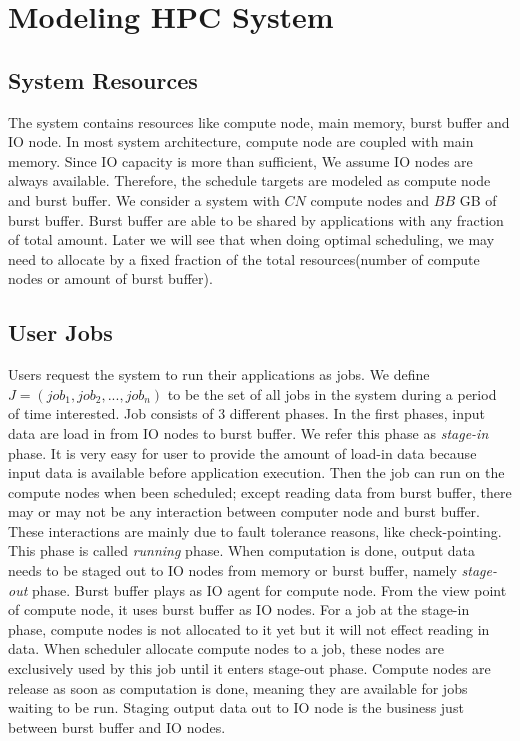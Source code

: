 \section{Modeling HPC System}
\subsection{System Resources}
The system contains resources like compute node, main memory, burst buffer and IO node.
In most system architecture, compute node are coupled with main memory.
Since IO capacity is more than sufficient, We assume IO nodes are always available.
Therefore, the schedule targets are modeled as compute node and burst buffer.
We consider a system with $CN$ compute nodes and $BB$ GB of burst buffer.
Burst buffer are able to be shared by applications with any fraction of total amount.
Later we will see that when doing optimal scheduling, we may need to allocate by a fixed
fraction of the total resources(number of compute nodes or amount of burst buffer).

\subsection{User Jobs}
Users request the system to run their applications as jobs.
We define $J = (job_1, job_2,..., job_n)$ to be the set of all jobs in the system during
a period of time interested.
Job consists of 3 different phases.
In the first phases, input data are load in from IO nodes to burst buffer.
We refer this phase as \textit{stage-in} phase.
It is very easy for user to provide the amount of load-in data because input data is available before application execution. 
Then the job can run on the compute nodes when been scheduled;
except reading data from burst buffer, there may or may not be any interaction between computer node and burst buffer.
These interactions are mainly due to fault tolerance reasons, like check-pointing.
This phase is called \textit{running} phase.
When computation is done, output data needs to be staged out to IO nodes from memory or burst buffer, namely \textit{stage-out} phase.
Burst buffer plays as IO agent for compute node.
From the view point of compute node, it uses burst buffer as IO nodes.
For a job at the stage-in phase, compute nodes is not allocated to it yet but it will not effect reading in data.
When scheduler allocate compute nodes to a job, these nodes are exclusively used by this job until it enters stage-out phase.
Compute nodes are release as soon as computation is done, meaning they are available for jobs waiting to be run.
Staging output data out to IO node is the business just between burst buffer and IO nodes.


